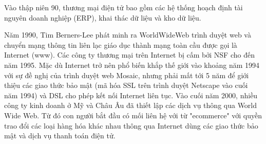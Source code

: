 \documentclass[12pt]{article}
\begin{document}
Vào thập niên 90, thương mại điện tử bao gồm các hệ thống hoạch định tài nguyên doanh nghiệp (ERP), khai thác dữ liệu và kho dữ liệu.

Năm 1990, Tim Berners-Lee phát minh ra WorldWideWeb trình duyệt web và chuyển mạng thông tin liên lạc giáo dục thành mạng toàn cầu được gọi là Internet (www). Các công ty thương mại trên Internet bị cấm bởi NSF cho đến năm 1995. Mặc dù Internet trở nên phổ biến khắp thế giới vào khoảng năm 1994 với sự đề nghị của trình duyệt web Mosaic, nhưng phải mất tới 5 năm để giới thiệu các giao thức bảo mật (mã hóa SSL trên trình duyệt Netscape vào cuối năm 1994) và DSL cho phép kết nối Internet liên tục. Vào cuối năm 2000, nhiều công ty kinh doanh ở Mỹ và Châu  Âu đã thiết lập các dịch vụ thông qua World Wide Web. Từ đó con người bắt đầu có mối liên hệ với từ "ecommerce" với quyền trao đổi các loại hàng hóa khác nhau thông qua Internet dùng các giao thức bảo mật và dịch vụ thanh toán điện tử.
\end{document}
